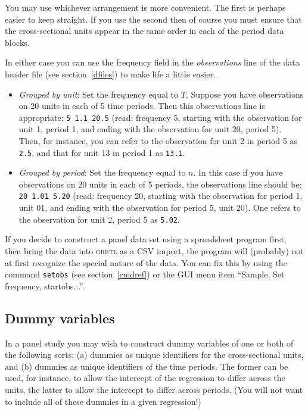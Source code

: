 \documentclass{article}
\begin{document}
You may use whichever arrangement is more convenient.  The first is
perhaps easier to keep straight.  If you use the second then of course
you must ensure that the cross-sectional units appear in the same
order in each of the period data blocks.

In either case you can use the frequency field in the
\textit{observations} line of the data header file (see
section~\ref{dfiles}) to make life a little easier.

\begin{itemize}
\item \textit{Grouped by unit}: Set the frequency equal to $T$.
  Suppose you have observations on 20 units in each of 5 time periods.
  Then this observations line is appropriate: \texttt{5 1.1 20.5}
  (read: frequency 5, starting with the observation for unit 1, period
  1, and ending with the observation for unit 20, period 5).  Then,
  for instance, you can refer to the observation for unit 2 in period
  5 as \texttt{2.5}, and that for unit 13 in period 1 as
  \texttt{13.1}.
\item \textit{Grouped by period}: Set the frequency equal to $n$.  In
  this case if you have observations on 20 units in each of 5 periods,
  the observations line should be: \texttt{20 1.01 5.20} (read:
  frequency 20, starting with the observation for period 1, unit 01,
  and ending with the observation for period 5, unit 20).  One refers
  to the observation for unit 2, period 5 as \texttt{5.02}.
\end{itemize}

If you decide to construct a panel data set using a spreadsheet
program first, then bring the data into \textsc{gretl} as a CSV
import, the program will (probably) not at first recognize the special
nature of the data.  You can fix this by using the command
\texttt{setobs} (see section~\ref{cmdref}) or the GUI menu item
``Sample, Set frequency, startobs...''.

\subsection{Dummy variables}

In a panel study you may wish to construct dummy variables of one or
both of the following sorts: (a) dummies as unique identifiers for the
cross-sectional units, and (b) dummies as unique identifiers of the
time periods.  The former can be used, for instance, to allow the
intercept of the regression to differ across the units, the latter to
allow the intercept to differ across periods.  (You will not want to
include all of these dummies in a given regression!)
\end{document}

